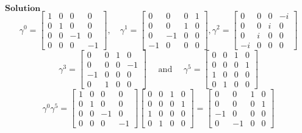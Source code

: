 $\boxed{\textbf{Solution}}$ 
$$
\gamma^{0}=\begin{bmatrix}
1 & 0 & 0 & 0 \\
0 & 1 & 0 & 0 \\
0 & 0 & -1 & 0 \\
0 & 0 & 0 & -1
\end{bmatrix}, \quad \gamma^{1}=\begin{bmatrix}
0 & 0 & 0 & 1 \\
0 & 0 & 1 & 0 \\
0 & -1 & 0 & 0 \\
-1 & 0 & 0 & 0
\end{bmatrix}, \gamma^{2}=\begin{bmatrix}
0 & 0 & 0 & -i \\
0 & 0 & i & 0 \\
0 & i & 0 & 0 \\
-i & 0 & 0 & 0
\end{bmatrix}
$$
$$
\gamma^{3}=\begin{bmatrix}
0 & 0 & 1 & 0 \\
0 & 0 & 0 & -1 \\
-1 & 0 & 0 & 0 \\
0 & 1 & 0 & 0
\end{bmatrix}\quad \text { and }\quad \gamma^{5}=\begin{bmatrix}
0 & 0 & 1 & 0 \\
0 & 0 & 0 & 1 \\
1 & 0 & 0 & 0 \\
0 & 1 & 0 & 0
\end{bmatrix}
$$
$$
\gamma^{0} \gamma^{5}=\begin{bmatrix}
1 & 0 & 0 & 0 \\
0 & 1 & 0 & 0 \\
0 & 0 & -1 & 0 \\
0 & 0 & 0 & -1
\end{bmatrix}\begin{bmatrix}
0 & 0 & 1 & 0 \\
0 & 0 & 0 & 1 \\
1 & 0 & 0 & 0 \\
0 & 1 & 0 & 0
\end{bmatrix}=\begin{bmatrix}
0 & 0 & 1 & 0 \\
0 & 0 & 0 & 1 \\
-1 & 0 & 0 & 0 \\
0 & -1 & 0 & 0
\end{bmatrix}
$$
